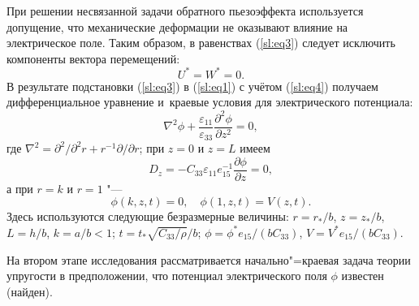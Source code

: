При решении несвязанной задачи обратного пьезоэффекта используется допущение, что механические деформации не оказывают влияние на электрическое поле. 
Таким образом, в равенствах (\ref{sl:eq3}) следует исключить компоненты вектора перемещений: 
\begin{equation}
\label{sl:eq4}
U^*  =W^*  =0.
\end{equation}
В результате подстановки (\ref{sl:eq3}) в  (\ref{sl:eq1}) с учётом (\ref{sl:eq4}) получаем дифференциальное уравнение и~краевые условия для электрического потенциала:
\begin{equation}
\label{sl:eq5}
\nabla ^2\phi +\frac{\varepsilon _{11} }{\varepsilon _{33} }\frac{\partial ^2\phi }{\partial z^2}=0,
\end{equation}
где $\nabla^2 = \partial^2 / \partial^2 r +r^{-1} \partial / \partial r$;
при $z=0$ и $z=L$ имеем
\begin{equation}
\label{sl:eq6}
D_z =-C_{33} \varepsilon _{11} e_{15}^{-1} \frac{\partial \phi }{\partial z}=0,
\end{equation}
а при $r=k$ и $r=1$ "---
\begin{equation}
\label{sl:eq7}
\phi ( k, z, t)=0, \quad \phi (1, z, t)=V(z, t). 
\end{equation}
Здесь используются следующие безразмерные величины:
 $r=r_*/b$, $z=z_*/b$, $L=h/b$, $k=a/b < 1$; $t= t_* \sqrt{C_{33}/\rho}/b$;
$\phi=\phi^* e_{15}/(bC_{33})$, $V=V^* e_{15}/(bC_{33})$.


На втором этапе исследования рассматривается начально"=краевая задача теории  упругости в предположении, что потенциал электрического поля $\phi$
известен (найден).

